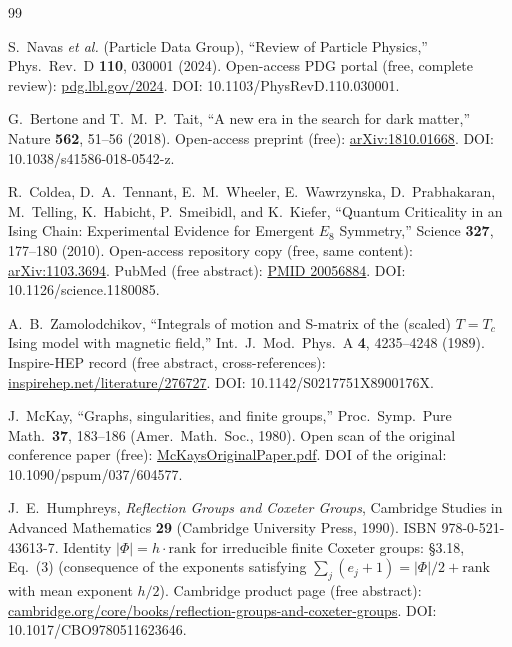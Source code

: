 ﻿\documentclass[reprint,amsmath,amssymb,aps,prd,longbibliography,floatfix]{revtex4-2}
\begin{document}
\begin{thebibliography}{99}

 S.~Navas \textit{et al.} (Particle Data Group),
``Review of Particle Physics,'' Phys.\ Rev.\ D \textbf{110}, 030001 (2024).
Open-access PDG portal (free, complete review):
\href{https://pdg.lbl.gov/2024/}{pdg.lbl.gov/2024}.
DOI: 10.1103/PhysRevD.110.030001.

 G.~Bertone and T.~M.~P.~Tait,
``A new era in the search for dark matter,''
Nature \textbf{562}, 51--56 (2018).
Open-access preprint (free): \href{https://arxiv.org/abs/1810.01668}{arXiv:1810.01668}.
DOI: 10.1038/s41586-018-0542-z.

 R.~Coldea, D.~A.~Tennant, E.~M.~Wheeler, E.~Wawrzynska,
D.~Prabhakaran, M.~Telling, K.~Habicht, P.~Smeibidl, and K.~Kiefer,
``Quantum Criticality in an Ising Chain: Experimental Evidence for Emergent $E_8$ Symmetry,''
Science \textbf{327}, 177--180 (2010).
Open-access repository copy (free, same content):
\href{https://arxiv.org/abs/1103.3694}{arXiv:1103.3694}.
PubMed (free abstract): \href{https://pubmed.ncbi.nlm.nih.gov/20056884/}{PMID 20056884}.
DOI: 10.1126/science.1180085.

 A.~B.~Zamolodchikov,
``Integrals of motion and S-matrix of the (scaled) $T = T_c$ Ising model with magnetic field,''
Int.\ J.\ Mod.\ Phys.\ A \textbf{4}, 4235--4248 (1989).
Inspire-HEP record (free abstract, cross-references):
\href{https://inspirehep.net/literature/276727}{inspirehep.net/literature/276727}.
DOI: 10.1142/S0217751X8900176X.

 J.~McKay,
``Graphs, singularities, and finite groups,''
Proc.\ Symp.\ Pure Math.\ \textbf{37}, 183--186 (Amer.\ Math.\ Soc., 1980).
Open scan of the original conference paper (free):
\href{https://www-users.cse.umn.edu/~reiner/ReadingSeminars/McKaySeminar2016/McKaysOriginalPaper.pdf}{McKaysOriginalPaper.pdf}.
DOI of the original: 10.1090/pspum/037/604577.

 J.~E.~Humphreys,
\textit{Reflection Groups and Coxeter Groups},
Cambridge Studies in Advanced Mathematics \textbf{29}
(Cambridge University Press, 1990).
ISBN 978-0-521-43613-7.
Identity $|\Phi| = h \cdot \text{rank}$ for irreducible finite
Coxeter groups: \S 3.18, Eq.\ (3) (consequence of the exponents
satisfying $\sum_j (e_j + 1) = |\Phi|/2 + \text{rank}$ with
mean exponent $h/2$).
Cambridge product page (free abstract):
\href{https://www.cambridge.org/core/books/reflection-groups-and-coxeter-groups/0D40E18E1B0CC9CD32EF1B14D9E89B79}{cambridge.org/core/books/reflection-groups-and-coxeter-groups}.
DOI: 10.1017/CBO9780511623646.


\end{thebibliography}
\end{document}
